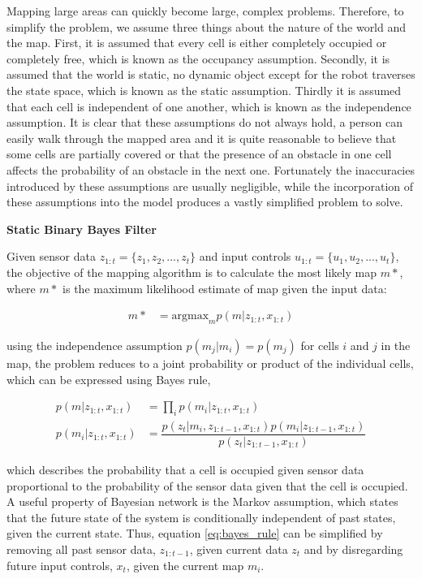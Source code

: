 Mapping large areas can quickly become large, complex problems. Therefore, to simplify the problem, we assume three things about the nature of the world and the map. First, it is assumed that every cell is either completely occupied or completely free, which is known as the occupancy assumption. Secondly, it is assumed that the world is static, no dynamic object except for the robot traverses the state space, which is known as the static assumption. Thirdly it is assumed that each cell is independent of one another, which is known as the independence assumption. It is clear that these assumptions do not always hold, a person can easily walk through the mapped area and it is quite reasonable to believe that some cells are partially covered or that the presence of an obstacle in one cell affects the probability of an obstacle in the next one. Fortunately the inaccuracies introduced by these assumptions are usually negligible, while the incorporation of these assumptions into the model produces a vastly simplified problem to solve.

\textbf{Static Binary Bayes Filter}

Given sensor data $z_{1:t}=\{z_1,z_2,...,z_t\}$ and input controls $u_{1:t}=\{u_1,u_2,...,u_t\}$, the objective of the mapping algorithm is to calculate the most likely map $m*$, where $m*$ is the maximum likelihood estimate of map given the input data:

\begin{align}
    m* &= \text{argmax}_m p(m|z_{1:t}, x_{1:t})
\end{align}

using the independence assumption $p(m_j|m_i) = p(m_j)$ for cells $i$ and $j$ in the map, the problem reduces to a joint probability or product of the individual cells, which can be expressed using Bayes rule,

\begin{align}
    p(m|z_{1:t},x_{1:t}) &= \prod_i p(m_i|z_{1:t},x_{1:t}) \\
    p(m_i|z_{1:t},x_{1:t}) &= \dfrac{p(z_t|m_i,z_{1:t-1},x_{1:t}) p(m_i|z_{1:t-1},x_{1:t})}{p(z_t|z_{1:t-1},x_{1:t})}
    \label{eq:bayes_rule}
\end{align}

which describes the probability that a cell is occupied given sensor data proportional to the probability of the sensor data given that the cell is occupied. A useful property of Bayesian network is the Markov assumption, which states that the future state of the system is conditionally independent of past states, given the current state. Thus, equation \ref{eq:bayes_rule} can be simplified by removing all past sensor data, $z_{1:t-1}$, given current data $z_t$ and by disregarding future input controls, $x_t$, given the current map $m_i$.

